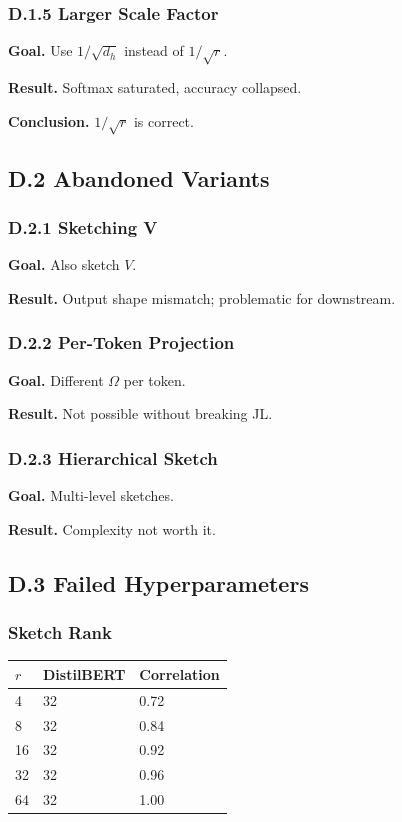 \subsubsection{D.1.5 Larger Scale Factor}

\textbf{Goal.} Use $1/\sqrt{d_h}$ instead of $1/\sqrt{r}$.

\textbf{Result.} Softmax saturated, accuracy collapsed.

\textbf{Conclusion.} $1/\sqrt{r}$ is correct.

\subsection{D.2 Abandoned Variants}

\subsubsection{D.2.1 Sketching V}

\textbf{Goal.} Also sketch $V$.

\textbf{Result.} Output shape mismatch; problematic for downstream.

\subsubsection{D.2.2 Per-Token Projection}

\textbf{Goal.} Different $\Omega$ per token.

\textbf{Result.} Not possible without breaking JL.

\subsubsection{D.2.3 Hierarchical Sketch}

\textbf{Goal.} Multi-level sketches.

\textbf{Result.} Complexity not worth it.

\subsection{D.3 Failed Hyperparameters}

\subsubsection{Sketch Rank}

\begin{table}[H]
\centering
\small
\begin{tabular}{lll}
\toprule
\textbf{$r$} & \textbf{DistilBERT} & \textbf{Correlation} \\
\midrule
4 & 32 & 0.72 \\
8 & 32 & 0.84 \\
16 & 32 & 0.92 \\
32 & 32 & 0.96 \\
64 & 32 & 1.00 \\
\bottomrule
\end{tabular}
\end{table}

